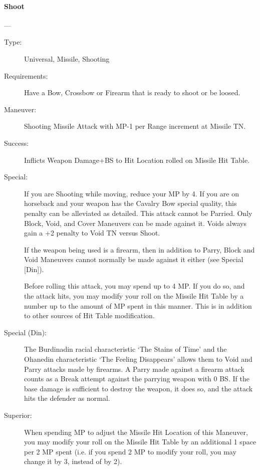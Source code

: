 \documentclass[oneside,11pt,english]{book}
\begin{document}
\paragraph{\large\label{man:Shoot}Shoot}---\quad{\large[???????]}
\vspace{-10pt}\begin{description} 
\item [Type:] Universal, Missile, Shooting 
\item [Requirements:] Have a Bow, Crossbow or Firearm that is ready to shoot or be loosed. 
\item [Maneuver:] Shooting Missile Attack with MP-1 per Range increment at Missile TN. 
\item [Success:] Inflicts Weapon Damage+BS to Hit Location rolled on Missile Hit Table. 
\item [Special:] If you are Shooting while moving, reduce your MP by 4. If you are on horseback and your 
  weapon has the Cavalry Bow special quality, this penalty can be alleviated as detailed. 
  This attack cannot be Parried. Only Block, Void, and Cover Maneuvers can be made against it. 
  Voids always gain a +2 penalty to Void TN versus Shoot.

  If the weapon being used is a firearm, then in addition to Parry, Block and Void Maneuvers cannot 
  normally be made against it either (see Special [Din]). 

  Before rolling this attack, you may spend up to 4 MP. If you do so, and the attack hits, you may modify 
  your roll on the Missile Hit Table by a number up to the amount of MP spent in this manner. This is in 
  addition to other sources of Hit Table modification. 
\item [Special (Din):] The Burdinadin racial characteristic ‘The Stains of Time’ and the Ohanedin characteristic 
  ‘The Feeling Disappears’ allows them to Void and Parry attacks made by firearms. A Parry made against 
  a firearm attack counts as a Break attempt against the parrying weapon with 0 BS. If the base damage is 
  sufficient to destroy the weapon, it does so, and the attack hits the defender as normal. 
\item [Superior:] When spending MP to adjust the Missile Hit Location of this Maneuver, you may modify your 
  roll on the Missile Hit Table by an additional 1 space per 2 MP spent (i.e. if you spend 2 MP to modify 
  your roll, you may change it by 3, instead of by 2). 
\end{description}
\end{document}
